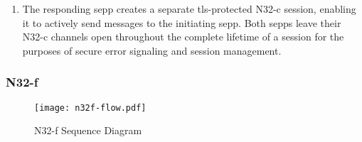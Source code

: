 \begin{enumerate}[wide, labelwidth=!, labelindent=0pt]
    \item The responding \gls{sepp} creates a separate \gls{tls}-protected N32-c session, enabling it to actively send messages to the initiating \gls{sepp}. Both \glspl{sepp} leave their N32-c channels open throughout the complete lifetime of a session for the purposes of secure error signaling and session management.
\end{enumerate}

\subsubsection{N32-f}

\begin{figure}[h!]
    \centering
    \texttt{[image: n32f-flow.pdf]}
    \caption{N32-f Sequence Diagram}
    \label{fig:n32f-sequence}
\end{figure}

